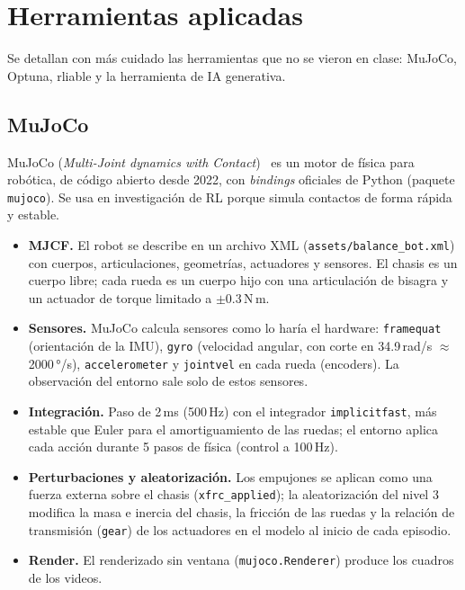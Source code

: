 \documentclass[11pt,a4paper]{article}
\newcommand{\code}[1]{\texttt{#1}}
\newcommand{\SI}[2]{#1\,#2}  %
\begin{document}
\section{Herramientas aplicadas}

Se detallan con más cuidado las herramientas que no se vieron en clase: MuJoCo, Optuna, rliable y la herramienta de IA generativa.

\subsection{MuJoCo}

MuJoCo (\emph{Multi-Joint dynamics with Contact})~\cite{todorov2012} es un motor de física para robótica, de código abierto desde 2022, con \emph{bindings} oficiales de Python (paquete \code{mujoco}). Se usa en investigación de RL porque simula contactos de forma rápida y estable.

\begin{itemize}
  \item \textbf{MJCF.} El robot se describe en un archivo XML (\code{assets/balance\_bot.xml}) con cuerpos, articulaciones, geometrías, actuadores y sensores. El chasis es un cuerpo libre; cada rueda es un cuerpo hijo con una articulación de bisagra y un actuador de torque limitado a $\pm$\SI{0.3}{N\,m}.
  \item \textbf{Sensores.} MuJoCo calcula sensores como lo haría el hardware: \code{framequat} (orientación de la IMU), \code{gyro} (velocidad angular, con corte en \SI{34.9}{rad/s} $\approx$ \SI{2000}{°/s}), \code{accelerometer} y \code{jointvel} en cada rueda (encoders). La observación del entorno sale solo de estos sensores.
  \item \textbf{Integración.} Paso de \SI{2}{ms} (\SI{500}{Hz}) con el integrador \code{implicitfast}, más estable que Euler para el amortiguamiento de las ruedas; el entorno aplica cada acción durante 5 pasos de física (control a \SI{100}{Hz}).
  \item \textbf{Perturbaciones y aleatorización.} Los empujones se aplican como una fuerza externa sobre el chasis (\code{xfrc\_applied}); la aleatorización del nivel 3 modifica la masa e inercia del chasis, la fricción de las ruedas y la relación de transmisión (\code{gear}) de los actuadores en el modelo al inicio de cada episodio.
  \item \textbf{Render.} El renderizado sin ventana (\code{mujoco.Renderer}) produce los cuadros de los videos.
\end{itemize}
\end{document}
